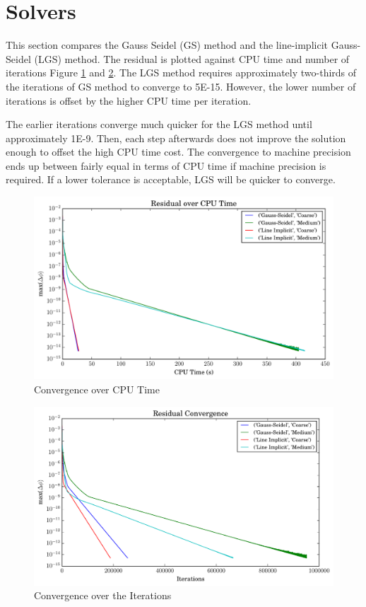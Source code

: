 \documentclass[letterpaper,12pt,]{article}
\begin{document}
\clearpage
\section*{Solvers}

This section compares the Gauss Seidel (GS) method and the line-implicit Gauss-Seidel (LGS) method.
The residual is plotted against CPU time and number of iterations Figure \ref{fig:q4time} and \ref{fig:q4res}.
The LGS method requires approximately two-thirds of the iterations of GS method to converge to 5\textsc{E-}15.
However, the lower number of iterations is offset by the higher CPU time per iteration.

The earlier iterations converge much quicker for the LGS method until approximately 1\textsc{E-}9.
Then, each step afterwards does not improve the solution enough to offset the high CPU time cost.
The convergence to machine precision ends up between fairly equal in terms of CPU time if machine precision is required.
If a lower tolerance is acceptable, LGS will be quicker to converge.


\begin{figure}[!htbp]
    \centering
    \includegraphics[width=\linewidth]{./Figures/q4time.pdf}
    \caption{Convergence over CPU Time}
    \label{fig:q4time}
\end{figure}

\begin{figure}[!htbp]
    \centering
    \includegraphics[width=\linewidth]{./Figures/q4res.pdf}
    \caption{Convergence over the Iterations}
    \label{fig:q4res}
\end{figure}
\end{document}
